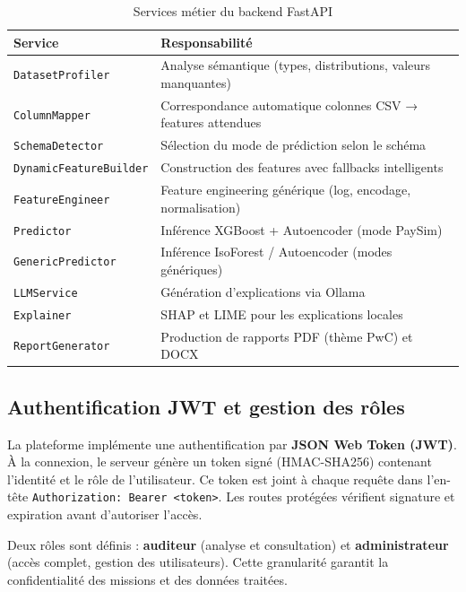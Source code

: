 \documentclass[12pt,a4paper,twoside]{report}
\begin{document}
\begin{table}[H]
\centering
\caption{Services métier du backend FastAPI}
\label{tab:services_backend}
\begin{tabular}{ll}
\toprule
\textbf{Service} & \textbf{Responsabilité} \\
\midrule
\texttt{DatasetProfiler}    & Analyse sémantique (types, distributions, valeurs manquantes) \\
\texttt{ColumnMapper}       & Correspondance automatique colonnes CSV → features attendues \\
\texttt{SchemaDetector}     & Sélection du mode de prédiction selon le schéma \\
\texttt{DynamicFeatureBuilder} & Construction des features avec fallbacks intelligents \\
\texttt{FeatureEngineer}    & Feature engineering générique (log, encodage, normalisation) \\
\texttt{Predictor}          & Inférence XGBoost + Autoencoder (mode PaySim) \\
\texttt{GenericPredictor}   & Inférence IsoForest / Autoencoder (modes génériques) \\
\texttt{LLMService}         & Génération d'explications via Ollama \\
\texttt{Explainer}          & SHAP et LIME pour les explications locales \\
\texttt{ReportGenerator}    & Production de rapports PDF (thème PwC) et DOCX \\
\bottomrule
\end{tabular}
\end{table}

\subsection{Authentification JWT et gestion des rôles}

La plateforme implémente une authentification par \textbf{JSON Web Token (JWT)}. À la connexion, le serveur génère un token signé (HMAC-SHA256) contenant l'identité et le rôle de l'utilisateur. Ce token est joint à chaque requête dans l'en-tête \texttt{Authorization: Bearer <token>}. Les routes protégées vérifient signature et expiration avant d'autoriser l'accès.

Deux rôles sont définis : \textbf{auditeur} (analyse et consultation) et \textbf{administrateur} (accès complet, gestion des utilisateurs). Cette granularité garantit la confidentialité des missions et des données traitées.
\end{document}

